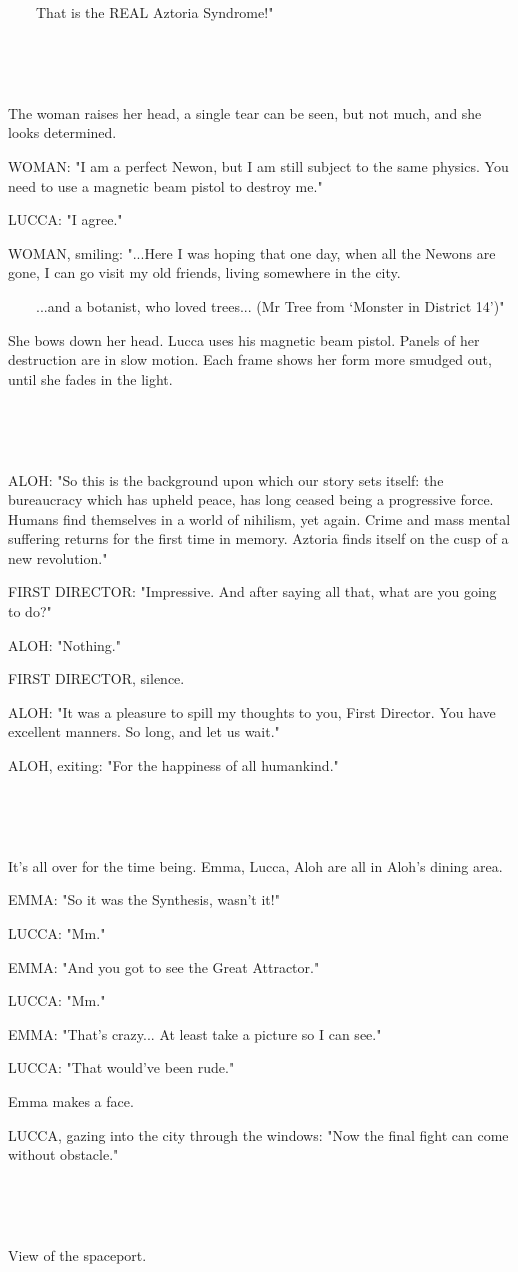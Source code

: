 \documentclass[11pt]{article}
\begin{document}
\ \ \ \ That is the REAL Aztoria Syndrome!"

\ 

\ 

The woman raises her head, a single tear can be seen, but not much, and she looks determined.

WOMAN: "I am a perfect Newon, but I am still subject to the same physics.
You need to use a magnetic beam pistol to destroy me."

LUCCA: "I agree."

WOMAN, smiling: "...Here I was hoping that one day, when all the Newons are gone, I can go visit my old friends, living somewhere in the city.

\ \ \ \ ...and a botanist, who loved trees... (Mr Tree from `Monster in District 14')"

She bows down her head.
Lucca uses his magnetic beam pistol.
Panels of her destruction are in slow motion.
Each frame shows her form more smudged out, until she fades in the light.

\ 

\ 

ALOH: "So this is the background upon which our story sets itself: 
the bureaucracy which has upheld peace, has long ceased being a progressive force. 
Humans find themselves in a world of nihilism, yet again.
Crime and mass mental suffering returns for the first time in memory.
Aztoria finds itself on the cusp of a new revolution." 

FIRST DIRECTOR: "Impressive. And after saying all that, what are you going to do?"

ALOH: "Nothing."

FIRST DIRECTOR, silence.

ALOH: "It was a pleasure to spill my thoughts to you, First Director.
You have excellent manners.
So long, and let us wait."

ALOH, exiting: "For the happiness of all humankind."

\ 

\ 

It's all over for the time being.
Emma, Lucca, Aloh are all in Aloh's dining area.

EMMA: "So it was the Synthesis, wasn't it!"

LUCCA: "Mm."

EMMA: "And you got to see the Great Attractor."

LUCCA: "Mm."

EMMA: "That's crazy...
At least take a picture so I can see."

LUCCA: "That would've been rude."

Emma makes a face.

LUCCA, gazing into the city through the windows: "Now the final fight can come without obstacle."

\ 

\ 

View of the spaceport.
\end{document}
